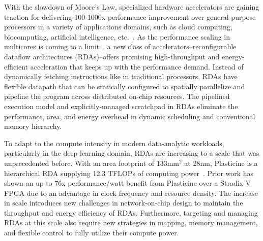 
With the slowdown of Moore’s Law, specialized hardware accelerators are gaining traction
for delivering 100-1000x performance improvement over general-purpose
processors in a variety of applications domains, such as cloud computing, biocomputing, 
artificial intelligence, etc.~\cite{fpgacloudsurvey,bioaccel,genomicaccel}.
As the performance scaling in multicores is coming to a limit~\cite{multicorescale}, a new
class of accelerators--reconfigurable dataflow architectures (RDAs)--offers  
promising high-throughput and energy-efficient acceleration that keeps up with the performance demand.
Instead of dynamically fetching instructions like in traditional processors, RDAs have flexible datapath 
that can be statically configured to spatially parallelize and pipeline the program across
distributed on-chip resources. 
The pipelined execution model and explicitly-managed scratchpad in RDAs eliminate
the performance, area, and energy overhead in dynamic scheduling and conventional memory hierarchy.

To adapt to the compute intensity in modern data-analytic workloads, particularly in the deep learning
domain, RDAs are increasing to a scale that was unprecedented before.
With an area footprint of $133\text{mm}^2$ at 28nm, 
Plasticine is a hierarchical RDA supplying 12.3 TFLOPs of computing power~\cite{plasticine}.
Prior work has shown an up to 76x performance/watt benefit from Plasticine over a Stradix V FPGA 
due to an advantage in clock frequency and resource density.
The increase in scale introduces new challenges in network-on-chip design to maintain 
the throughput and energy efficiency of RDAs.
Furthermore, targeting and managing RDAs at this scale also require new strategies in mapping, 
memory management, and flexible control to fully utilize their compute power. 

